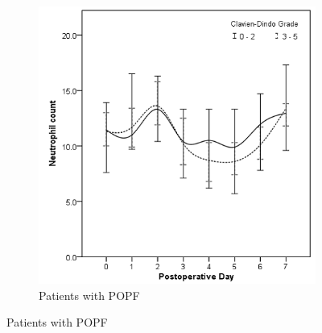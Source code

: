 \begin{figure}[t]
\begin{subfigure}{0.48\textwidth}
		\includegraphics[width=\textwidth]{Figures/crp_comp_Neutrophil_infective_leak1}
		\caption{Patients with POPF}
		\label{fig:crp_comp_Neutrophil_infective_leak1}
	\end{subfigure}
\end{figure}
\vfill


